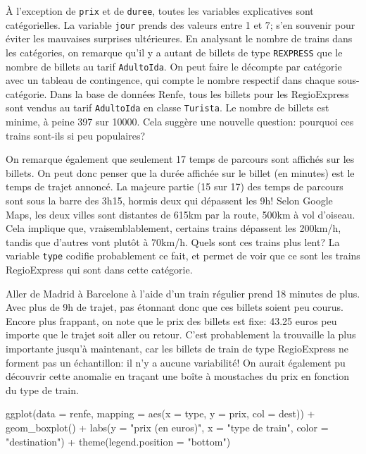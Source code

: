 \documentclass[
  11pt,
  letterpaper,
]{book}
\newenvironment{Shaded}{\begin{snugshade}}{\end{snugshade}}
\newcommand{\AttributeTok}[1]{\textcolor[rgb]{0.40,0.45,0.13}{#1}}
\newcommand{\FunctionTok}[1]{\textcolor[rgb]{0.28,0.35,0.67}{#1}}
\newcommand{\NormalTok}[1]{\textcolor[rgb]{0.00,0.23,0.31}{#1}}
\newcommand{\SpecialCharTok}[1]{\textcolor[rgb]{0.37,0.37,0.37}{#1}}
\newcommand{\StringTok}[1]{\textcolor[rgb]{0.13,0.47,0.30}{#1}}
\theoremstyle{definition}
\theoremstyle{remark}
\begin{document}
À l'exception de \texttt{prix} et de \texttt{duree}, toutes les
variables explicatives sont catégorielles. La variable \texttt{jour}
prends des valeurs entre 1 et 7; s'en souvenir pour éviter les mauvaises
surprises ultérieures. En analysant le nombre de trains dans les
catégories, on remarque qu'il y a autant de billets de type
\texttt{REXPRESS} que le nombre de billets au tarif \texttt{AdultoIda}.
On peut faire le décompte par catégorie avec un tableau de contingence,
qui compte le nombre respectif dans chaque sous-catégorie. Dans la base
de données Renfe, tous les billets pour les RegioExpress sont vendus au
tarif \texttt{AdultoIda} en classe \texttt{Turista}. Le nombre de
billets est minime, à peine 397 sur 10000. Cela suggère une nouvelle
question: pourquoi ces trains sont-ils si peu populaires?

On remarque également que seulement 17 temps de parcours sont affichés
sur les billets. On peut donc penser que la durée affichée sur le billet
(en minutes) est le temps de trajet annoncé. La majeure partie (15 sur
17) des temps de parcours sont sous la barre des 3h15, hormis deux qui
dépassent les 9h! Selon Google Maps, les deux villes sont distantes de
615km par la route, 500km à vol d'oiseau. Cela implique que,
vraisemblablement, certains trains dépassent les 200km/h, tandis que
d'autres vont plutôt à 70km/h. Quels sont ces trains plus lent? La
variable \texttt{type} codifie probablement ce fait, et permet de voir
que ce sont les trains RegioExpress qui sont dans cette catégorie.

Aller de Madrid à Barcelone à l'aide d'un train régulier prend 18
minutes de plus. Avec plus de 9h de trajet, pas étonnant donc que ces
billets soient peu courus. Encore plus frappant, on note que le prix des
billets est fixe: 43.25 euros peu importe que le trajet soit aller ou
retour. C'est probablement la trouvaille la plus importante jusqu'à
maintenant, car les billets de train de type RegioExpress ne forment pas
un échantillon: il n'y a aucune variabilité! On aurait également pu
découvrir cette anomalie en traçant une boîte à moustaches du prix en
fonction du type de train.

\begin{Shaded}
\begin{Highlighting}[]
\FunctionTok{ggplot}\NormalTok{(}\AttributeTok{data =}\NormalTok{ renfe, }
       \AttributeTok{mapping =} \FunctionTok{aes}\NormalTok{(}\AttributeTok{x =}\NormalTok{ type, }\AttributeTok{y =}\NormalTok{ prix, }\AttributeTok{col =}\NormalTok{ dest)) }\SpecialCharTok{+} 
  \FunctionTok{geom\_boxplot}\NormalTok{() }\SpecialCharTok{+} 
  \FunctionTok{labs}\NormalTok{(}\AttributeTok{y =} \StringTok{"prix (en euros)"}\NormalTok{,}
       \AttributeTok{x =} \StringTok{"type de train"}\NormalTok{,}
       \AttributeTok{color =} \StringTok{"destination"}\NormalTok{) }\SpecialCharTok{+}
  \FunctionTok{theme}\NormalTok{(}\AttributeTok{legend.position =} \StringTok{"bottom"}\NormalTok{)}
\end{Highlighting}
\end{Shaded}
\end{document}
